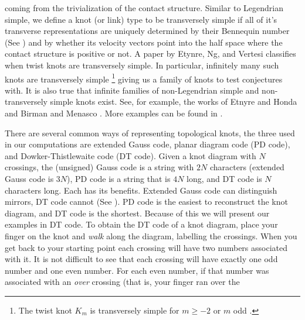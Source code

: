 \documentclass{article}
\theoremstyle{plain}
\begin{document}
        coming from the trivialization of the contact structure.
        Similar to Legendrian simple, we define a knot
        (or link) type to be transversely simple if all of it's transverse
        representations are uniquely determined by their Bennequin number
        (See \cite{BirmanWrinkleTransversallySimpleKnots}) and by whether its
        velocity vectors point into the half space where the contact structure
        is positive or not. A paper by Etynre, Ng, and Vertesi
        \cite{EtnyreEtAlLegendrianAndTransverseTwistKnots}
        classifies when twist knots are transversely simple. In
        particular, infinitely many such knots are transversely simple
        \footnote{%
            The twist knot $K_{m}$ is transversely simple for $m\geq{-2}$
            or $m$ odd \cite{EtnyreEtAlLegendrianAndTransverseTwistKnots}.
        }
        giving
        us a family of knots to test conjectures with. It is also true that
        infinite families of non-Legendrian simple and non-transversely simple
        knots exist. See, for example, the works of Etnyre and Honda
        \cite{EtnyreHondaCabling} and Birman and Menasco
        \cite{BirmanMenasco2006}. More examples can be found in
        \cite{Foldvari2019legnonsimple}.
        \par\hfill\par
        There are several common ways of representing topological knots, the
        three used in our computations are extended Gauss code, planar diagram
        code (PD code), and Dowker-Thistlewaite code (DT code). Given a knot
        diagram with $N$ crossings, the (unsigned) Gauss code is a string with $2N$
        characters (extended Gauss code is $3N$),
        PD code is a string that is $4N$ long, and DT code is $N$
        characters long. Each has its benefits. Extended Gauss code
        can distinguish mirrors, DT code cannot
        (See \cite{DOWKER198319}). PD code is the easiest to
        reconstruct the knot diagram, and DT code is the shortest. Because of
        this we will present our examples in DT code. To obtain the DT code of
        a knot diagram, place your finger on the knot and \textit{walk} along
        the diagram, labelling the crossings. When you get back to your starting
        point each crossing will have two numbers associated with it. It is
        not difficult to see that each crossing will have exactly one odd number
        and one even number. For each even number, if that number was associated
        with an \textit{over} crossing (that is, your finger ran over the
\end{document}
